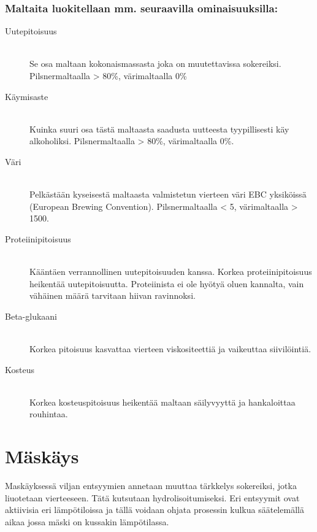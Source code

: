 \documentclass[a4paper,11pt]{report}
\begin{document}
\subsubsection*{Maltaita luokitellaan mm. seuraavilla ominaisuuksilla:}

\begin{description}
\item[Uutepitoisuus] \hfill \\
Se osa maltaan kokonaismassasta joka on muutettavissa sokereiksi. Pilsnermaltaalla > 80\%, värimaltaalla 0\%
\item[Käymisaste] \hfill \\
Kuinka suuri osa tästä maltaasta saadusta uutteesta tyypillisesti käy alkoholiksi. Pilsnermaltaalla > 80\%, värimaltaalla 0\%.

\item[Väri] \hfill \\
Pelkästään kyseisestä maltaasta valmistetun vierteen väri EBC yksiköissä (European Brewing Convention). Pilsnermaltaalla < 5, värimaltaalla > 1500.
\item[Proteiinipitoisuus] \hfill \\
Kääntäen verrannollinen uutepitoisuuden kanssa. Korkea proteiinipitoisuus heikentää uutepitoisuutta. Proteiinista ei ole hyötyä oluen kannalta, vain vähäinen määrä tarvitaan hiivan ravinnoksi.
\item[Beta-glukaani] \hfill \\
Korkea pitoisuus kasvattaa vierteen viskositeettiä ja vaikeuttaa siivilöintiä.
\item[Kosteus] \hfill \\
Korkea kosteuspitoisuus heikentää maltaan säilyvyyttä ja hankaloittaa rouhintaa.
\end{description}

\section{Mäskäys}

Maskäyksessä viljan entsyymien annetaan muuttaa tärkkelys sokereiksi, jotka liuotetaan vierteeseen. Tätä kutsutaan hydrolisoitumiseksi. Eri entsyymit ovat aktiivisia eri lämpötiloissa ja tällä voidaan ohjata prosessin kulkua säätelemällä aikaa jossa mäski on kussakin lämpötilassa.
\end{document}
